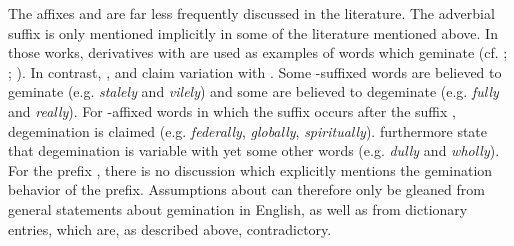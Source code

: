 The affixes  and  are far less frequently discussed in the literature. 
The adverbial suffix  is only mentioned implicitly in some of the literature mentioned above. In those works, derivatives with  are used as examples of words which geminate (cf. \citealt[141]{Wijk.1966}; \citealt[23]{Harris.1994}; \citealt[22]{Spencer.1996}). In contrast, \citet[82]{Bauer.2001}, \citet[353]{Giegerich.2012} and \citet[169]{Bauer.2013} claim variation with . Some -suffixed words are believed to geminate (e.g. \textit{stalely} and \textit{vilely}) and some are believed to {degeminate} (e.g. \textit{fully} and \textit{really}). For -affixed words in which the suffix occurs after the suffix , {degemination} is claimed (e.g.  \textit{federally}, \textit{globally}, \textit{spiritually}). \citet[169]{Bauer.2013} furthermore state that {degemination} is variable with yet some other words (e.g. \textit{dully} and \textit{wholly}). 
For the prefix , there is no discussion which explicitly mentions the gemination behavior of the prefix. Assumptions about  can therefore only be gleaned from general statements about gemination in English, as well as from dictionary entries, which are, as described above, contradictory. 

